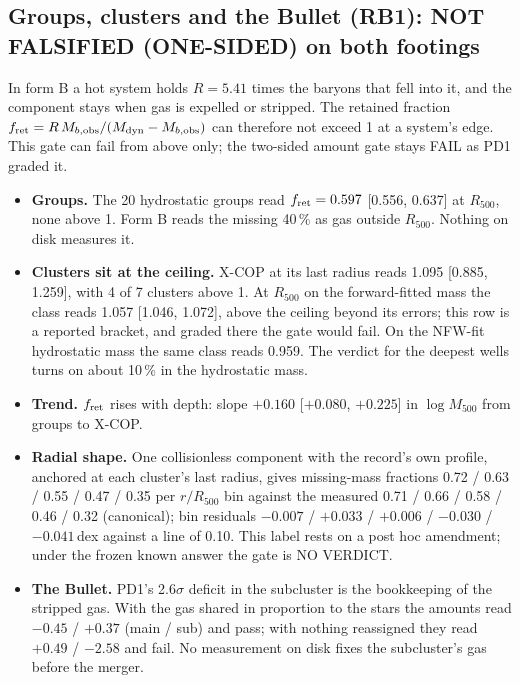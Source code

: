 \documentclass[10pt]{article}
\begin{document}
\subsection{Groups, clusters and the Bullet (RB1): NOT FALSIFIED (ONE-SIDED) on both footings}
In form B a hot system holds $R=5.41$ times the baryons that fell into it, and the component stays when gas is expelled or stripped. The retained fraction $f_{\rm ret}=R\,M_{b,\rm obs}/(M_{\rm dyn}-M_{b,\rm obs})$ can therefore not exceed 1 at a system's edge. This gate can fail from above only; the two-sided amount gate stays FAIL as PD1 graded it.
\begin{itemize}
\item \textbf{Groups.} The 20 hydrostatic groups read $f_{\rm ret}=0.597$ [0.556, 0.637] at $R_{500}$, none above 1. Form B reads the missing 40\,\% as gas outside $R_{500}$. Nothing on disk measures it.
\item \textbf{Clusters sit at the ceiling.} X-COP at its last radius reads 1.095 [0.885, 1.259], with 4 of 7 clusters above 1. At $R_{500}$ on the forward-fitted mass the class reads 1.057 [1.046, 1.072], above the ceiling beyond its errors; this row is a reported bracket, and graded there the gate would fail. On the NFW-fit hydrostatic mass the same class reads 0.959. The verdict for the deepest wells turns on about 10\,\% in the hydrostatic mass.
\item \textbf{Trend.} $f_{\rm ret}$ rises with depth: slope $+0.160$ [$+0.080$, $+0.225$] in $\log M_{500}$ from groups to X-COP.
\item \textbf{Radial shape.} One collisionless component with the record's own profile, anchored at each cluster's last radius, gives missing-mass fractions 0.72 / 0.63 / 0.55 / 0.47 / 0.35 per $r/R_{500}$ bin against the measured 0.71 / 0.66 / 0.58 / 0.46 / 0.32 (canonical); bin residuals $-0.007$ / $+0.033$ / $+0.006$ / $-0.030$ / $-0.041$\,dex against a line of 0.10. This label rests on a post hoc amendment; under the frozen known answer the gate is NO VERDICT.
\item \textbf{The Bullet.} PD1's 2.6$\sigma$ deficit in the subcluster is the bookkeeping of the stripped gas. With the gas shared in proportion to the stars the amounts read $-0.45$ / $+0.37$ (main / sub) and pass; with nothing reassigned they read $+0.49$ / $-2.58$ and fail. No measurement on disk fixes the subcluster's gas before the merger.
\end{itemize}
\end{document}
